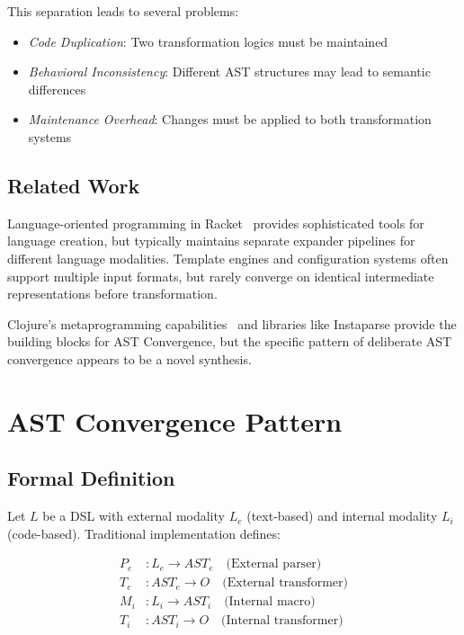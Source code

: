 \documentclass[conference]{IEEEtran}
\begin{document}
This separation leads to several problems:
\begin{itemize}
\item \emph{Code Duplication}: Two transformation logics must be maintained
\item \emph{Behavioral Inconsistency}: Different AST structures may lead to semantic differences
\item \emph{Maintenance Overhead}: Changes must be applied to both transformation systems
\end{itemize}

\subsection{Related Work}

Language-oriented programming in Racket~\cite{racket} provides sophisticated tools for language creation, but typically maintains separate expander pipelines for different language modalities. Template engines and configuration systems often support multiple input formats, but rarely converge on identical intermediate representations before transformation.

Clojure's metaprogramming capabilities~\cite{clojure} and libraries like Instaparse provide the building blocks for AST Convergence, but the specific pattern of deliberate AST convergence appears to be a novel synthesis.

\section{AST Convergence Pattern}

\subsection{Formal Definition}

Let $L$ be a DSL with external modality $L_e$ (text-based) and internal modality $L_i$ (code-based). Traditional implementation defines:

\begin{align*}
P_e &: L_e \rightarrow AST_e \quad \text{(External parser)}\\
T_e &: AST_e \rightarrow O \quad \text{(External transformer)}\\
M_i &: L_i \rightarrow AST_i \quad \text{(Internal macro)}\\
T_i &: AST_i \rightarrow O \quad \text{(Internal transformer)}
\end{align*}
\end{document}
